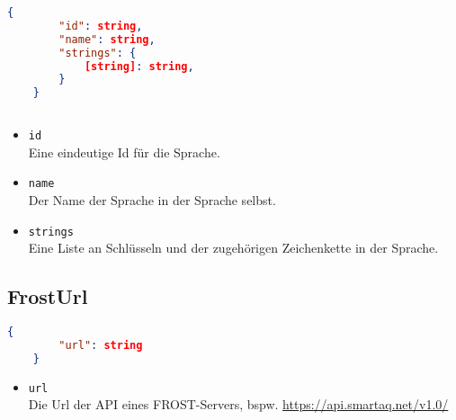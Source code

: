 \begin{lstlisting}[language=json,firstnumber=1]
	{
		"id": string,
		"name": string,
		"strings": {
			[string]: string,
		}
	}
	
\end{lstlisting}

\begin{itemize}
	\item \texttt{id} 
	\\ Eine eindeutige Id für die Sprache.
	\item \texttt{name} 
	\\ Der Name der Sprache in der Sprache selbst.
	\item \texttt{strings} 
	\\ Eine Liste an Schlüsseln und der zugehörigen Zeichenkette in der Sprache.
\end{itemize}

\subsection{FrostUrl}

\begin{lstlisting}[language=json, firstnumber=1]
	{
  		"url": string
	}

\end{lstlisting}

\begin{itemize}
	\item \texttt{url}
	\\ Die Url der API eines FROST-Servers, bspw. \url{https://api.smartaq.net/v1.0/}
\end{itemize}